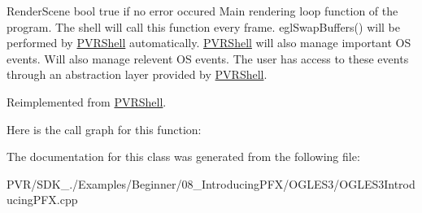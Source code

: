   Render\+Scene  bool true if no error occured  Main rendering loop function of the program. The shell will call this function every frame. egl\+Swap\+Buffers() will be performed by \hyperlink{class_p_v_r_shell}{P\+V\+R\+Shell} automatically. \hyperlink{class_p_v_r_shell}{P\+V\+R\+Shell} will also manage important O\+S events. Will also manage relevent O\+S events. The user has access to these events through an abstraction layer provided by \hyperlink{class_p_v_r_shell}{P\+V\+R\+Shell}. 

Reimplemented from \hyperlink{class_p_v_r_shell_ae0eb5f797cbe993a22b8659f9c332578}{P\+V\+R\+Shell}.



Here is the call graph for this function\+:




The documentation for this class was generated from the following file\+:\begin{DoxyCompactItemize}
\item 
P\+V\+R/\+S\+D\+K\+\_./\+Examples/\+Beginner/08\+\_\+\+Introducing\+P\+F\+X/\+O\+G\+L\+E\+S3/O\+G\+L\+E\+S3\+Introducing\+P\+F\+X.\+cpp\end{DoxyCompactItemize}
